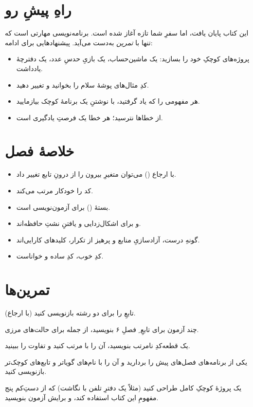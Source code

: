 \section{راهِ پیشِ رو}

این کتاب پایان یافت، اما سفرِ شما تازه آغاز شده است. برنامه‌نویسی مهارتی است که
تنها با \emph{تمرین} به‌دست می‌آید. پیشنهادهایی برای ادامه:

\begin{itemize}
  \item پروژه‌های کوچکِ خود را بسازید: یک ماشین‌حساب، یک بازیِ حدسِ عدد، یک
        دفترچهٔ یادداشت.
  \item کدِ مثال‌های پوشهٔ  سلام را بخوانید و تغییر دهید.
  \item هر مفهومی را که یاد گرفتید، با نوشتنِ یک برنامهٔ کوچک بیازمایید.
  \item از خطاها نترسید؛ هر خطا یک فرصتِ یادگیری است.
\end{itemize}

\section{خلاصهٔ فصل}

\begin{itemize}
  \item با ارجاع (\code{\&}) می‌توان متغیرِ بیرون را از درونِ تابع تغییر داد.
  \item {} کد را خودکار مرتب می‌کند.
  \item بستهٔ  () برای آزمون‌نویسی است.
  \item {} و  برای اشکال‌زدایی و یافتنِ نشتِ
        حافظه‌اند.
  \item گونهِ درست، آزادسازیِ منابع و پرهیز از تکرار، کلیدهای کارایی‌اند.
  \item کدِ خوب، کدِ ساده و خواناست.
\end{itemize}

\section{تمرین‌ها}

\exercise تابعِ  را برای دو رشته بازنویسی کنید (با ارجاع).

\exercise چند آزمون برای تابعِ ِ فصلِ ۶ بنویسید، از جمله برای
حالت‌های مرزی.

\exercise یک قطعه‌کدِ نامرتب بنویسید، آن را با  مرتب کنید و
تفاوت را ببینید.

\exercise یکی از برنامه‌های فصل‌های پیش را بردارید و آن را با نام‌های گویاتر و
تابع‌های کوچک‌تر بازنویسی کنید.

\exercise یک پروژهٔ کوچکِ کامل طراحی کنید (مثلاً یک دفترِ تلفن با نگاشت) که از
دستِ‌کم پنج مفهومِ این کتاب استفاده کند، و برایش آزمون بنویسید.
